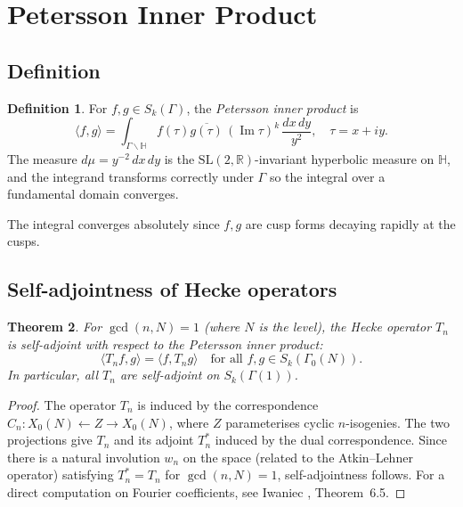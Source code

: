 \documentclass[12pt,a4paper]{amsart}
\newtheorem{theorem}{Theorem}[section]
\theoremstyle{definition}
\newtheorem{definition}[theorem]{Definition}
\begin{document}
\section{Petersson Inner Product}\label{sec:petersson}

\subsection{Definition}

\begin{definition}
  For $f, g \in S_k(\Gamma)$, the \emph{Petersson inner product} is
  \[
    \langle f, g \rangle = \int_{\Gamma \backslash \mathbb{H}}
    f(\tau)\overline{g(\tau)}\,(\operatorname{Im}\tau)^k\,
    \frac{dx\,dy}{y^2}, \quad \tau = x + iy.
  \]
  The measure $d\mu = y^{-2}\,dx\,dy$ is the $\mathrm{SL}(2,\mathbb{R})$-invariant
  hyperbolic measure on $\mathbb{H}$, and the integrand transforms correctly
  under $\Gamma$ so the integral over a fundamental domain converges.
\end{definition}

The integral converges absolutely since $f,g$ are cusp forms decaying
rapidly at the cusps.

\subsection{Self-adjointness of Hecke operators}

\begin{theorem}\label{thm:selfadjoint}
  For $\gcd(n, N) = 1$ (where $N$ is the level), the Hecke operator $T_n$
  is self-adjoint with respect to the Petersson inner product:
  \[
    \langle T_n f, g \rangle = \langle f, T_n g \rangle
    \quad \text{for all } f, g \in S_k(\Gamma_0(N)).
  \]
  In particular, all $T_n$ are self-adjoint on $S_k(\Gamma(1))$.
\end{theorem}

\begin{proof}
  The operator $T_n$ is induced by the correspondence
  $C_n \colon X_0(N) \leftarrow Z \to X_0(N)$, where $Z$ parameterises
  cyclic $n$-isogenies. The two projections give $T_n$ and its adjoint $T_n^*$
  induced by the dual correspondence. Since there is a natural involution
  $w_n$ on the space (related to the Atkin--Lehner operator) satisfying
  $T_n^* = T_n$ for $\gcd(n,N)=1$, self-adjointness follows. For a direct
  computation on Fourier coefficients, see Iwaniec \cite{Iwaniec}, Theorem~6.5.
\end{proof}
\end{document}

